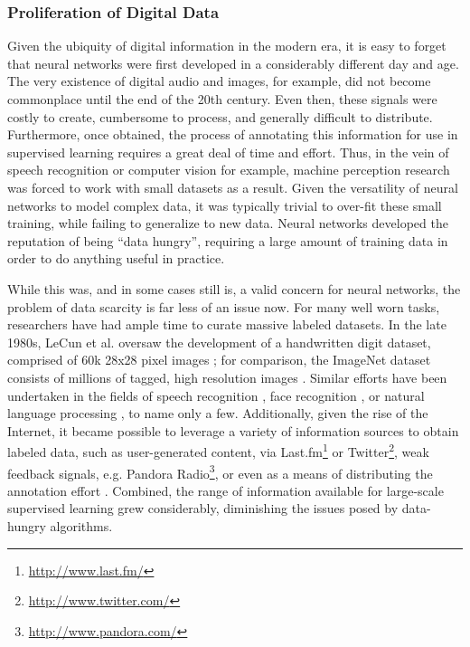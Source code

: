 \subsubsection{Proliferation of Digital Data}
\label{subsec:perceptrons}

Given the ubiquity of digital information in the modern era, it is easy to forget that neural networks were first developed in a considerably different day and age.
The very existence of digital audio and images, for example, did not become commonplace until the end of the 20th century.
Even then, these signals were costly to create, cumbersome to process, and generally difficult to distribute.
Furthermore, once obtained, the process of annotating this information for use in supervised learning requires a great deal of time and effort.
Thus, in the vein of speech recognition or computer vision for example, machine perception research was forced to work with small datasets as a result.
Given the versatility of neural networks to model complex data, it was typically trivial to over-fit these small training, while failing to generalize to new data.
Neural networks developed the reputation of being ``data hungry'', requiring a large amount of training data in order to do anything useful in practice.

While this was, and in some cases still is, a valid concern for neural networks, the problem of data scarcity is far less of an issue now.
For many well worn tasks, researchers have had ample time to curate massive labeled datasets.
In the late 1980s, LeCun et al. oversaw the development of a handwritten digit dataset, comprised of 60k 28x28 pixel images \cite{LeCun1998MNIST};
for comparison, the ImageNet dataset consists of millions of tagged, high resolution images \cite{Deng2009Imagenet}.
Similar efforts have been undertaken in the fields of speech recognition \cite{Fisher1986TIMIT}, face recognition \cite{Huang2007Labeled}, or natural language processing \cite{Lewis2004RCV1}, to name only a few.
Additionally, given the rise of the Internet, it became possible to leverage a variety of information sources to obtain labeled data, such as user-generated content, via Last.fm\footnote{\url{http://www.last.fm/}} or Twitter\footnote{\url{http://www.twitter.com/}}, weak feedback signals, e.g. Pandora Radio\footnote{\url{http://www.pandora.com/}}, or even as a means of distributing the annotation effort \cite{Von2003Captcha}.
Combined, the range of information available for large-scale supervised learning grew considerably, diminishing the issues posed by data-hungry algorithms.

